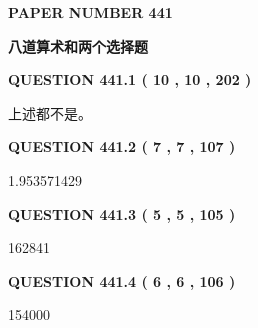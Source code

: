 \documentclass{ctexart}
\begin{document}
   
   
   
 {\textbf{ \Large{ PAPER NUMBER  441  }}}
   
   
\vspace{0.2in}
   
   
   
   
   
   
 \vspace{0.2in}
{\LARGE {\textbf{ 八道算术和两个选择题}}}
   
   
  
\vspace{0.2in}
  
{\textbf{\Large{QUESTION
441.1 
 ( 10 , 10 , 202 )
}}}
  
  
 
 
\noindent{}
 
 
 上述都不是。
 
 
 
 
  
\vspace{0.2in}
  
{\textbf{\Large{QUESTION
441.2 
 ( 7 , 7 , 107 )
}}}
  
  
 
 
\noindent{}

1.953571429
 
 
  
\vspace{0.2in}
  
{\textbf{\Large{QUESTION
441.3 
 ( 5 , 5 , 105 )
}}}
  
  
 
 
\noindent{}

162841
 
 
  
\vspace{0.2in}
  
{\textbf{\Large{QUESTION
441.4 
 ( 6 , 6 , 106 )
}}}
  
  
 
 
\noindent{}

154000
 
 
  
\end{document}
